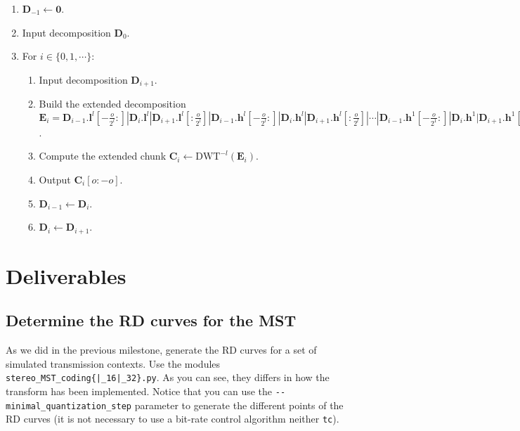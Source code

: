 \begin{enumerate}
\item ${\mathbf D}_{-1}\leftarrow{\mathbf 0}$.
\item Input decomposition ${\mathbf D}_0$.
\item For $i\in\{0,1,\cdots\}$:
  \begin{enumerate}
  \item Input decomposition ${\mathbf D}_{i+1}$.
  \item Build the extended decomposition ${\mathbf E}_i =
    {\mathbf D}_{i-1}.{\mathbf l}^l[-\frac{o}{2^l}:]|{\mathbf D}_i.{\mathbf l}^l|{\mathbf D}_{i+1}.{\mathbf l}^l[:\frac{o}{2^l}]|{\mathbf D}_{i-1}.{\mathbf h}^l[-\frac{o}{2^l}:]|{\mathbf D}_i.{\mathbf h}^l|{\mathbf D}_{i+1}.{\mathbf h}^l[:\frac{o}{2^l}]|\cdots|{\mathbf D}_{i-1}.{\mathbf h}^1[-\frac{o}{2^1}:]|{\mathbf D}_i.{\mathbf h}^1|{\mathbf D}_{i+1}.{\mathbf h}^1[:\frac{o}{2^1}]$.
  \item Compute the extended chunk ${\mathbf C}_i\leftarrow\text{DWT}^{-l}({\mathbf E}_i)$.
  \item Output ${\mathbf C}_i[o:-o]$.
  \item ${\mathbf D}_{i-1} \leftarrow {\mathbf D}_i$.
  \item ${\mathbf D}_i \leftarrow {\mathbf D}_{i+1}$.
  \end{enumerate}
\end{enumerate}





\section{Deliverables}

\subsection{Determine the RD curves for the MST}
As we did in the previous milestone, generate the RD curves for a set
of simulated transmission contexts. Use the modules
\texttt{stereo\_MST\_coding\{|\_16|\_32\}.py}. As you can see, they
differs in how the transform has been implemented.  Notice that you
can use the \verb|--minimal_quantization_step| parameter to generate
the different points of the RD curves (it is not necessary to use a
bit-rate control algorithm neither \texttt{tc}).

